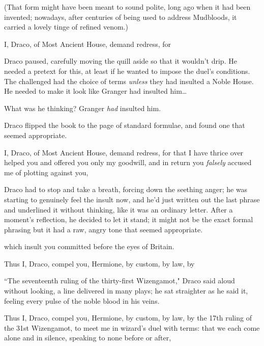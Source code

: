 (That form might have been meant to sound polite, long ago when it had been invented; nowadays, after centuries of being used to address Mudbloods, it carried a lovely tinge of refined venom.)

\begin{writtenNote}
I, Draco, of Most Ancient House, demand redress, for
\end{writtenNote}

Draco paused, carefully moving the quill aside so that it wouldn't drip. He needed a pretext for this, at least if he wanted to impose the duel's conditions. The challenged had the choice of terms \emph{unless} they had insulted a Noble House. He needed to make it look like Granger had insulted him{\ldots}

What was he thinking? Granger \emph{had} insulted him.

Draco flipped the book to the page of standard formulae, and found one that seemed appropriate.

\begin{writtenNote}
I, Draco, of Most Ancient House, demand redress, for that I have thrice over helped you and offered you only my goodwill, and in return you \emph{falsely} accused me of plotting against you,
\end{writtenNote}

Draco had to stop and take a breath, forcing down the seething anger; he was starting to genuinely feel the insult now, and he'd just written out the last phrase and underlined it without thinking, like it was an ordinary letter. After a moment's reflection, he decided to let it stand; it might not be the exact formal phrasing but it had a raw, angry tone that seemed appropriate.

\begin{writtenNote}
which insult you committed before the eyes of Britain.

Thus I, Draco, compel you, Hermione, by custom, by law, by
\end{writtenNote}

``The seventeenth ruling of the thirty-first Wizengamot," Draco said aloud without looking, a line delivered in many plays; he sat straighter as he said it, feeling every pulse of the noble blood in his veins.

\begin{writtenNote}
Thus I, Draco, compel you, Hermione, by custom, by law, by the 17th ruling of the 31st Wizengamot, to meet me in wizard's duel with terms: that we each come alone and in silence, speaking to none before or after,
\end{writtenNote}

